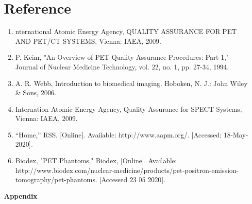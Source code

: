 \documentclass[12pt]{article}
\begin{document}
\section{Reference}
\begin{enumerate}

    \item nternational Atomic Energy Agency, QUALITY ASSURANCE FOR PET AND PET/CT SYSTEMS, Vienna: IAEA, 2009.
    \item P. Keim, "An Overview of PET Quality Assurance Procedures: Part 1," Journal of Nuclear Medicine Technology, vol. 22, no. 1, pp. 27-34, 1994. 
    \item A. R. Webb, Introduction to biomedical imaging. Hoboken, N. J.: John Wiley \& Sons, 2006.
    \item Internation Atomic Energy Agency, Quality Assurance for SPECT Systems, Vienna: IAEA, 2009.
    \item “Home,” RSS. [Online]. Available: http://www.aapm.org/. [Accessed: 18-May-2020].
    \item Biodex, "PET Phantoms," Biodex, [Online]. Available: http://www.biodex.com/nuclear-medicine/products/pet-positron-emission-tomography/pet-phantoms. [Accessed 23 05 2020].
    
    
\end{enumerate}
\pagebreak
\textbf{\Large{Appendix}}
\begin{appendix}
  \listoffigures
\end{appendix}
\end{document}

